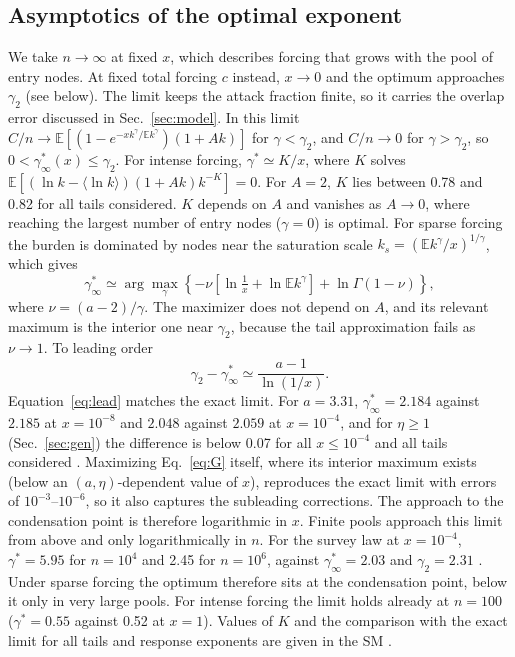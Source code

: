 \documentclass[pre,twocolumn,superscriptaddress,amsmath,amssymb,floatfix]{revtex4-2}
\newcommand{\E}{\mathbb{E}}
\newcommand{\avg}[1]{\langle #1\rangle}
\begin{document}
\subsection{Asymptotics of the optimal exponent}\label{sec:asym}
We take $n\to\infty$ at fixed $x$, which describes forcing that grows with the pool
of entry nodes. At fixed total forcing $c$ instead, $x\to0$ and the optimum
approaches $\gamma_2$ (see below). The limit keeps the attack fraction finite, so it
carries the overlap error discussed in Sec.~\ref{sec:model}. In this limit $C/n\to\E[(1-e^{-xk^\gamma/\E k^\gamma})(1+Ak)]$ for
$\gamma<\gamma_2$, and $C/n\to0$ for $\gamma>\gamma_2$, so $0<\gamma^*_\infty(x)\le\gamma_2$. For intense forcing,
$\gamma^*\simeq K/x$, where $K$ solves $\E[(\ln k-\avg{\ln k})(1+Ak)k^{-K}]=0$. For $A=2$, $K$ lies between 0.78 and 0.82 for all tails considered. $K$
depends on $A$ and vanishes as $A\to0$, where reaching the largest number of
entry nodes ($\gamma=0$) is optimal. For sparse forcing the burden is
dominated by nodes near the saturation scale $k_s=(\E k^\gamma/x)^{1/\gamma}$, which gives
\begin{equation}\label{eq:G}
\gamma^*_\infty\simeq\arg\max_\gamma\left\{-\nu\left[\ln\tfrac1x+\ln\E k^\gamma\right]+\ln\Gamma(1-\nu)\right\},
\end{equation}
where $\nu=(a-2)/\gamma$. The maximizer does not depend on $A$, and its relevant
maximum is the interior one near $\gamma_2$, because
the tail approximation fails as $\nu\to1$. To leading order
\begin{equation}\label{eq:lead}
\gamma_2-\gamma^*_\infty\simeq\frac{a-1}{\ln(1/x)} .
\end{equation}
Equation~\eqref{eq:lead} matches the exact limit. For $a=3.31$, $\gamma^*_\infty=2.184$
against $2.185$ at $x=10^{-8}$ and $2.048$ against $2.059$ at $x=10^{-4}$, and for $\eta\ge1$
(Sec.~\ref{sec:gen}) the difference is below 0.07 for all $x\le10^{-4}$ and all tails
considered \cite{SM}. Maximizing Eq.~\eqref{eq:G} itself, where its
interior maximum exists (below an $(a,\eta)$-dependent value of $x$), reproduces the
exact limit with errors of $10^{-3}$--$10^{-6}$, so it also captures the subleading
corrections. The approach to the condensation point is therefore
logarithmic in $x$. Finite pools approach this limit from above and only
logarithmically in $n$. For the survey law at $x=10^{-4}$, $\gamma^*=5.95$ for $n=10^4$ and
2.45 for $n=10^6$, against $\gamma^*_\infty=2.03$ and $\gamma_2=2.31$ \cite{SM}. Under sparse forcing
the optimum therefore sits at the condensation point, below it only in very
large pools. For intense forcing the limit holds already at $n=100$ ($\gamma^*=0.55$
against 0.52 at $x=1$).
Values of $K$ and the comparison with the exact limit for all tails and
response exponents are given in the SM \cite{SM}.
\end{document}
